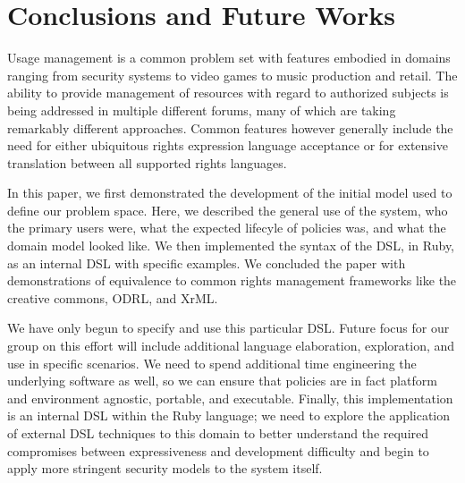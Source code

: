 \section{Conclusions and Future Works}
Usage management is a common problem set with features embodied in domains ranging from security systems to video games to music production and retail.  The ability to provide management of resources with regard to authorized subjects is being addressed in multiple different forums, many of which are taking remarkably different approaches.  Common features however generally include the need for either ubiquitous rights expression language acceptance or for extensive translation between all supported rights languages.

In this paper, we first demonstrated the development of the initial model used to define our problem space.  Here, we described the general use of the system, who the primary users were, what the expected lifecyle of policies was, and what the domain model looked like.  We then implemented the syntax of the DSL, in Ruby, as an internal DSL with specific examples.  We concluded the paper with demonstrations of equivalence to common rights management frameworks like the creative commons, ODRL, and XrML.

We have only begun to specify and use this particular DSL.  Future focus for our group on this effort will include additional language elaboration, exploration, and use in specific scenarios.  We need to spend additional time engineering the underlying software as well, so we can ensure that policies are in fact platform and environment agnostic, portable, and executable.  Finally, this implementation is an internal DSL within the Ruby language; we need to explore the application of external DSL techniques to this domain to better understand the required compromises between expressiveness and development difficulty and begin to apply more stringent security models to the system itself.